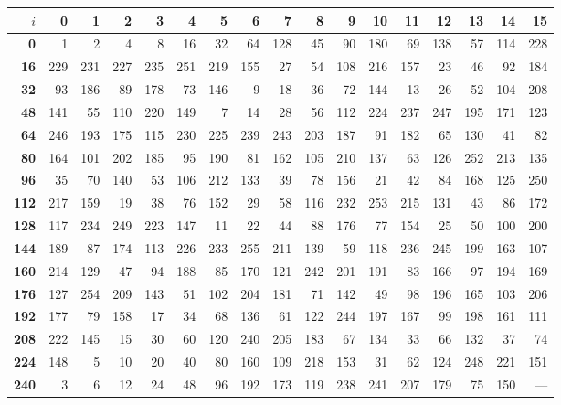 \begin{center}
\footnotesize
\setlength{\tabcolsep}{3pt}
\renewcommand{\arraystretch}{1.05}
\begin{tabular}{r|rrrrrrrrrrrrrrrr}
\toprule
$i$ & \textbf{0} & \textbf{1} & \textbf{2} & \textbf{3} & \textbf{4} & \textbf{5} & \textbf{6} & \textbf{7} & \textbf{8} & \textbf{9} & \textbf{10} & \textbf{11} & \textbf{12} & \textbf{13} & \textbf{14} & \textbf{15} \\
\midrule
\textbf{  0} & 1 & 2 & 4 & 8 & 16 & 32 & 64 & 128 & 45 & 90 & 180 & 69 & 138 & 57 & 114 & 228 \\
\textbf{ 16} & 229 & 231 & 227 & 235 & 251 & 219 & 155 & 27 & 54 & 108 & 216 & 157 & 23 & 46 & 92 & 184 \\
\textbf{ 32} & 93 & 186 & 89 & 178 & 73 & 146 & 9 & 18 & 36 & 72 & 144 & 13 & 26 & 52 & 104 & 208 \\
\textbf{ 48} & 141 & 55 & 110 & 220 & 149 & 7 & 14 & 28 & 56 & 112 & 224 & 237 & 247 & 195 & 171 & 123 \\
\textbf{ 64} & 246 & 193 & 175 & 115 & 230 & 225 & 239 & 243 & 203 & 187 & 91 & 182 & 65 & 130 & 41 & 82 \\
\textbf{ 80} & 164 & 101 & 202 & 185 & 95 & 190 & 81 & 162 & 105 & 210 & 137 & 63 & 126 & 252 & 213 & 135 \\
\textbf{ 96} & 35 & 70 & 140 & 53 & 106 & 212 & 133 & 39 & 78 & 156 & 21 & 42 & 84 & 168 & 125 & 250 \\
\textbf{112} & 217 & 159 & 19 & 38 & 76 & 152 & 29 & 58 & 116 & 232 & 253 & 215 & 131 & 43 & 86 & 172 \\
\textbf{128} & 117 & 234 & 249 & 223 & 147 & 11 & 22 & 44 & 88 & 176 & 77 & 154 & 25 & 50 & 100 & 200 \\
\textbf{144} & 189 & 87 & 174 & 113 & 226 & 233 & 255 & 211 & 139 & 59 & 118 & 236 & 245 & 199 & 163 & 107 \\
\textbf{160} & 214 & 129 & 47 & 94 & 188 & 85 & 170 & 121 & 242 & 201 & 191 & 83 & 166 & 97 & 194 & 169 \\
\textbf{176} & 127 & 254 & 209 & 143 & 51 & 102 & 204 & 181 & 71 & 142 & 49 & 98 & 196 & 165 & 103 & 206 \\
\textbf{192} & 177 & 79 & 158 & 17 & 34 & 68 & 136 & 61 & 122 & 244 & 197 & 167 & 99 & 198 & 161 & 111 \\
\textbf{208} & 222 & 145 & 15 & 30 & 60 & 120 & 240 & 205 & 183 & 67 & 134 & 33 & 66 & 132 & 37 & 74 \\
\textbf{224} & 148 & 5 & 10 & 20 & 40 & 80 & 160 & 109 & 218 & 153 & 31 & 62 & 124 & 248 & 221 & 151 \\
\textbf{240} & 3 & 6 & 12 & 24 & 48 & 96 & 192 & 173 & 119 & 238 & 241 & 207 & 179 & 75 & 150 & --- \\
\bottomrule
\end{tabular}
\end{center}
